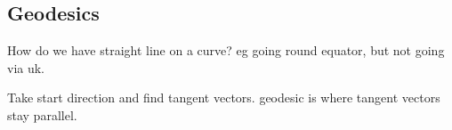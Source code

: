 
\subsection{Geodesics}

How do we have straight line on a curve? eg going round equator, but not going via uk.

Take start direction and find tangent vectors. geodesic is where tangent vectors stay parallel.


